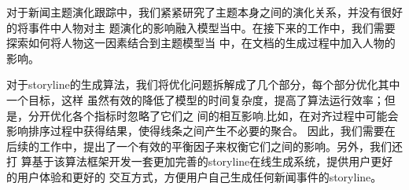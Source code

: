 对于新闻主题演化跟踪中，我们紧紧研究了主题本身之间的演化关系，并没有很好的将事件中人物对主
题演化的影响融入模型当中。在接下来的工作中，我们需要探索如何将人物这一因素结合到主题模型当
中，在文档的生成过程中加入人物的影响。

对于storyline的生成算法，我们将优化问题拆解成了几个部分，每个部分优化其中一个目标，这样
虽然有效的降低了模型的时间复杂度，提高了算法运行效率；但是，分开优化各个指标时忽略了它们之
间的相互影响.比如，在对齐过程中可能会影响排序过程中获得结果，使得线条之间产生不必要的聚合。
因此，我们需要在后续的工作中，提出了一个有效的平衡因子来权衡它们之间的影响。另外，我们还打
算基于该算法框架开发一套更加完善的storyline在线生成系统，提供用户更好的用户体验和更好的
交互方式，方便用户自己生成任何新闻事件的storyline。